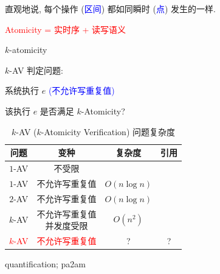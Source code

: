\begin{frame}{}
  \begin{cdef}
    直观地说, 每个操作 {\small (\textcolor{blue}{区间})} 都如同瞬时 {\small (\textcolor{blue}{点})} 发生的一样.

  \end{cdef}

  \vspace{0.30cm}
  \begin{center}
    \textcolor{red}{Atomicity = 实时序 + 读写语义}
  \end{center}
\end{frame}

\begin{frame}{}
  $k$-atomicity  

  \begin{cdef}
    $k$-AV 判定问题:
    \vspace{8pt}
    \begin{description}
      \setlength{\itemsep}{8pt}
      \item[实例:] 系统执行 $e$ \textcolor{blue}{\small (不允许写重复值)}
      \item[问题:] 该执行 $e$ 是否满足 $k$-Atomicity?
    \end{description}
  \end{cdef}
\end{frame}

\begin{frame}{}
  \begin{table}
    \centering
    \caption{$k$-AV {\small ($k$-Atomicity Verification)} 问题复杂度}
    \renewcommand\arraystretch{1.1}
    \begin{tabular}{|c|c|c|c|}
      \hline
      {\bf 问题} & {\bf 变种} & {\bf 复杂度} & {\bf 引用} \\ \hline \hline
      $1$-AV	&	不受限	&	\npc{}	&	\ncite{Gibbons:SICOMP97}	\\ \hline
      $1$-AV	&	不允许写重复值	&	$O(n \log n)$	&	\ncite{Gibbons:SICOMP97}	\\ \hline		
      $2$-AV	&	不允许写重复值	&	$O(n \log n)$	&	\ncite{Golab:ICDCS13}	\\ \hline
      $k$-AV	&	\innercell{c}{不允许写重复值 \\ 并发度受限}	&	$O(n^2)$	&	\ncite{Golab:PODC15}	\\ \hline
      \textcolor{red}{$k$-AV}	&	\textcolor{red}{不允许写重复值}	&	?	&	?	\\ \hline
    \end{tabular}
  \end{table}
\end{frame}

\begin{frame}{}
  quantification; pa2am
\end{frame}
